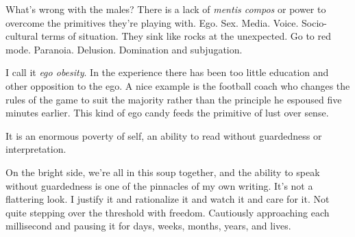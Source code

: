 

What's wrong with the males?  There is a lack of {\it mentis compos}
or power to overcome the primitives they're playing with.  Ego.  Sex.
Media.  Voice.  Socio-cultural terms of situation.  They sink like
rocks at the unexpected.  Go to red mode.  Paranoia.  Delusion.
Domination and subjugation.

I call it {\it ego obesity}.  In the experience there has been too
little education and other opposition to the ego.  A nice example is
the football coach who changes the rules of the game to suit the
majority rather than the principle he espoused five minutes earlier.
This kind of ego candy feeds the primitive of lust over sense.

It is an enormous poverty of self, an ability to read without
guardedness or interpretation.  

On the bright side, we're all in this soup together, and the ability
to speak without guardedness is one of the pinnacles of my own
writing.  It's not a flattering look.  I justify it and rationalize it
and watch it and care for it.  Not quite stepping over the threshold
with freedom.  Cautiously approaching each millisecond and pausing it
for days, weeks, months, years, and lives.

\bye
